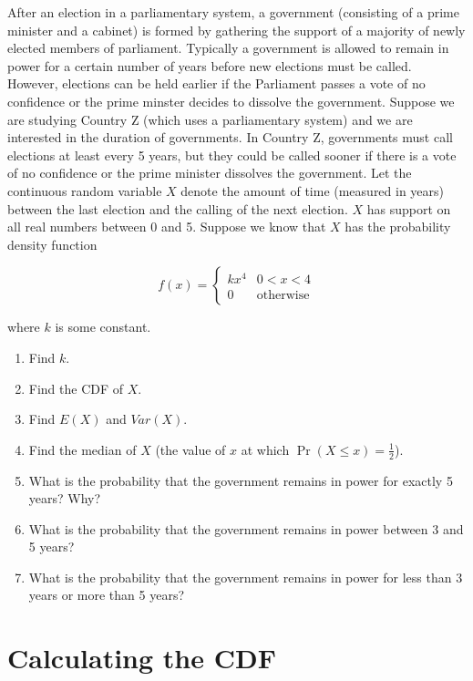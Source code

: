 \documentclass[
]{article}
\begin{document}
After an election in a parliamentary system, a government (consisting of
a prime minister and a cabinet) is formed by gathering the support of a
majority of newly elected members of parliament. Typically a government
is allowed to remain in power for a certain number of years before new
elections must be called. However, elections can be held earlier if the
Parliament passes a vote of no confidence or the prime minster decides
to dissolve the government. Suppose we are studying Country Z (which
uses a parliamentary system) and we are interested in the duration of
governments. In Country Z, governments must call elections at least
every 5 years, but they could be called sooner if there is a vote of no
confidence or the prime minister dissolves the government. Let the
continuous random variable \(X\) denote the amount of time (measured in
years) between the last election and the calling of the next election.
\(X\) has support on all real numbers between 0 and 5. Suppose we know
that \(X\) has the probability density function

\[
f(x) = \begin{cases}
kx^4 &  0 < x < 4 \\
0 & \text{otherwise}
\end{cases}
\]

where \(k\) is some constant.

\begin{enumerate}
\def\labelenumi{\alph{enumi}.}
\item
  Find \(k\).
\item
  Find the CDF of \(X\).
\item
  Find \(E(X)\) and \(Var(X)\).
\item
  Find the median of \(X\) (the value of \(x\) at which
  \(\Pr(X \leq x) = \frac{1}{2}\)).
\item
  What is the probability that the government remains in power for
  exactly 5 years? Why?
\item
  What is the probability that the government remains in power between 3
  and 5 years?
\item
  What is the probability that the government remains in power for less
  than 3 years or more than 5 years?
\end{enumerate}

\section{Calculating the CDF}\label{calculating-the-cdf}
\end{document}
